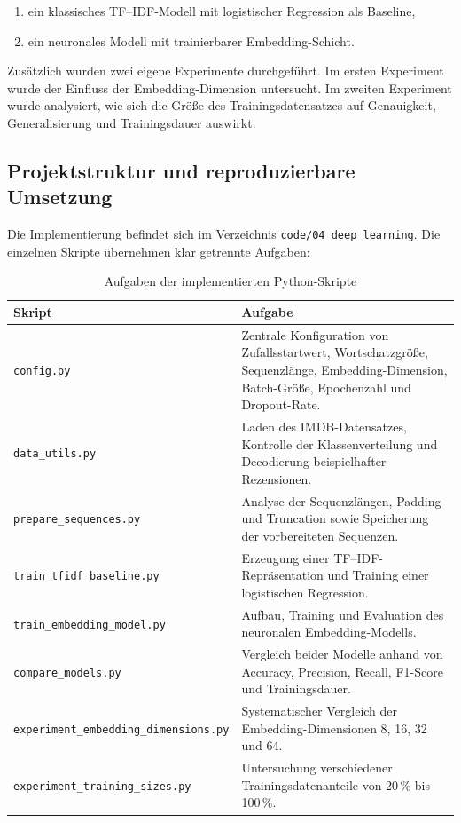 \documentclass[12pt,a4paper]{article}
\begin{document}
\begin{enumerate}
    \item ein klassisches TF--IDF-Modell mit logistischer Regression als Baseline,
    \item ein neuronales Modell mit trainierbarer Embedding-Schicht.
\end{enumerate}

Zusätzlich wurden zwei eigene Experimente durchgeführt. Im ersten Experiment wurde der Einfluss der Embedding-Dimension untersucht. Im zweiten Experiment wurde analysiert, wie sich die Größe des Trainingsdatensatzes auf Genauigkeit, Generalisierung und Trainingsdauer auswirkt.

\subsection{Projektstruktur und reproduzierbare Umsetzung}

Die Implementierung befindet sich im Verzeichnis
\texttt{code/04\_deep\_learning}. Die einzelnen Skripte übernehmen klar getrennte Aufgaben:

\begin{table}[H]
\centering
\caption{Aufgaben der implementierten Python-Skripte}
\label{tab:dl-scripts}
\begin{tabular}{p{}p{}}
\toprule
\textbf{Skript} & \textbf{Aufgabe} \\
\midrule
\texttt{config.py} &
Zentrale Konfiguration von Zufallsstartwert, Wortschatzgröße, Sequenzlänge, Embedding-Dimension, Batch-Größe, Epochenzahl und Dropout-Rate. \\

\texttt{data\_utils.py} &
Laden des IMDB-Datensatzes, Kontrolle der Klassenverteilung und Decodierung beispielhafter Rezensionen. \\

\texttt{prepare\_sequences.py} &
Analyse der Sequenzlängen, Padding und Truncation sowie Speicherung der vorbereiteten Sequenzen. \\

\texttt{train\_tfidf\_baseline.py} &
Erzeugung einer TF--IDF-Repräsentation und Training einer logistischen Regression. \\

\texttt{train\_embedding\_model.py} &
Aufbau, Training und Evaluation des neuronalen Embedding-Modells. \\

\texttt{compare\_models.py} &
Vergleich beider Modelle anhand von Accuracy, Precision, Recall, F1-Score und Trainingsdauer. \\

\texttt{experiment\_embedding\_dimensions.py} &
Systematischer Vergleich der Embedding-Dimensionen 8, 16, 32 und 64. \\

\texttt{experiment\_training\_sizes.py} &
Untersuchung verschiedener Trainingsdatenanteile von 20\,\% bis 100\,\%. \\
\bottomrule
\end{tabular}
\end{table}
\end{document}
